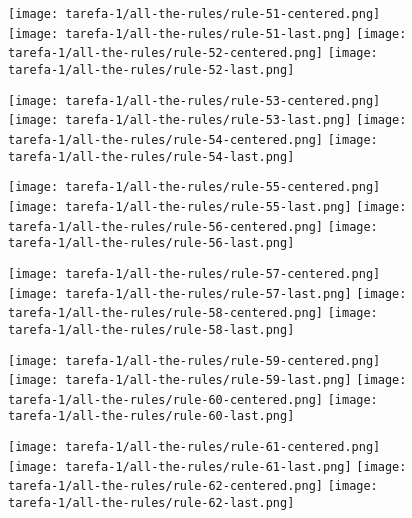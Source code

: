 \begin{figure}[htbp]
  \centering
\texttt{[image: tarefa-1/all-the-rules/rule-51-centered.png]}
\texttt{[image: tarefa-1/all-the-rules/rule-51-last.png]}
\texttt{[image: tarefa-1/all-the-rules/rule-52-centered.png]}
\texttt{[image: tarefa-1/all-the-rules/rule-52-last.png]}
\end{figure}
\begin{figure}[htbp]
  \centering
\texttt{[image: tarefa-1/all-the-rules/rule-53-centered.png]}
\texttt{[image: tarefa-1/all-the-rules/rule-53-last.png]}
\texttt{[image: tarefa-1/all-the-rules/rule-54-centered.png]}
\texttt{[image: tarefa-1/all-the-rules/rule-54-last.png]}
\end{figure}
\begin{figure}[htbp]
  \centering
\texttt{[image: tarefa-1/all-the-rules/rule-55-centered.png]}
\texttt{[image: tarefa-1/all-the-rules/rule-55-last.png]}
\texttt{[image: tarefa-1/all-the-rules/rule-56-centered.png]}
\texttt{[image: tarefa-1/all-the-rules/rule-56-last.png]}
\end{figure}
\begin{figure}[htbp]
  \centering
\texttt{[image: tarefa-1/all-the-rules/rule-57-centered.png]}
\texttt{[image: tarefa-1/all-the-rules/rule-57-last.png]}
\texttt{[image: tarefa-1/all-the-rules/rule-58-centered.png]}
\texttt{[image: tarefa-1/all-the-rules/rule-58-last.png]}
\end{figure}
\begin{figure}[htbp]
  \centering
\texttt{[image: tarefa-1/all-the-rules/rule-59-centered.png]}
\texttt{[image: tarefa-1/all-the-rules/rule-59-last.png]}
\texttt{[image: tarefa-1/all-the-rules/rule-60-centered.png]}
\texttt{[image: tarefa-1/all-the-rules/rule-60-last.png]}
\end{figure}
\begin{figure}[htbp]
  \centering
\texttt{[image: tarefa-1/all-the-rules/rule-61-centered.png]}
\texttt{[image: tarefa-1/all-the-rules/rule-61-last.png]}
\texttt{[image: tarefa-1/all-the-rules/rule-62-centered.png]}
\texttt{[image: tarefa-1/all-the-rules/rule-62-last.png]}
\end{figure}
